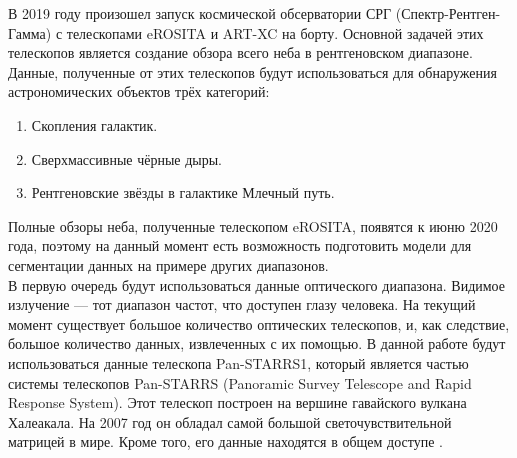\Introduction
В 2019 году произошел запуск космической обсерватории СРГ (Спектр-Рентген-Гамма) с телескопами 
eROSITA и ART-XC на борту. Основной задачей этих телескопов является создание обзора всего неба в 
рентгеновском диапазоне. Данные, полученные от этих телескопов будут использоваться для обнаружения 
астрономических объектов трёх категорий:

\begin{enumerate}
    \item Скопления галактик.
    \item Сверхмассивные чёрные дыры.
    \item Рентгеновские звёзды в галактике Млечный путь. 
\end{enumerate}

Полные обзоры неба, полученные телескопом eROSITA, появятся к июню 2020 года, поэтому на данный 
момент есть возможность подготовить модели для сегментации данных на примере других диапазонов.\\

В первую очередь будут использоваться данные оптического диапазона. Видимое излучение --- тот 
диапазон частот, что доступен глазу человека. На текущий момент существует большое количество 
оптических телескопов, и, как следствие, большое количество данных, извлеченных с их помощью. В 
данной работе будут использоваться данные телескопа Pan-STARRS1, который является частью системы 
телескопов Pan-STARRS (Panoramic Survey Telescope and Rapid Response System). Этот телескоп 
построен на вершине гавайского вулкана Халеакала. На 2007 год он обладал самой большой 
светочувствительной матрицей в мире. Кроме того, его данные находятся в общем доступе \cite{Panstarrs}.\\

